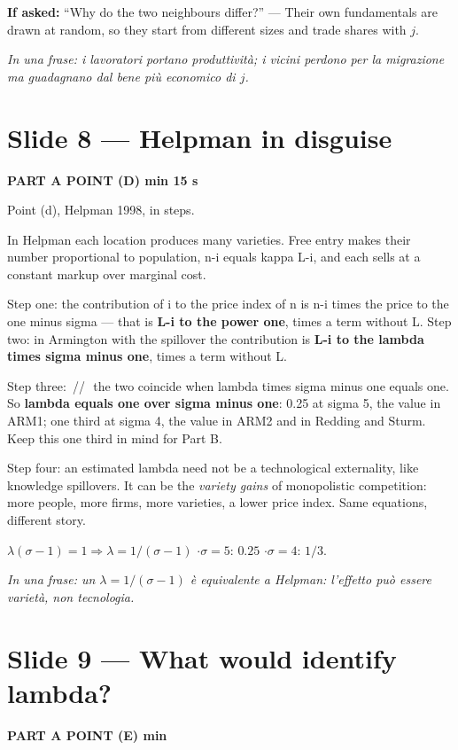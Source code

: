 \documentclass[11pt,a4paper]{article}
\newcommand{\slide}[3]{\Needspace{14\baselineskip}\section{#1}\textcolor{unicared}{\small\bfseries\MakeUppercase{#3}\quad\textperiodcentered\quad #2}\par}
\newcommand{\idea}[1]{\par{\small\itshape\color{unicablue}In una frase: #1}\par}
\newcommand{\pause}{\textcolor{unicared}{\,/\!/\,}}
\begin{document}
\begin{ask}
\textbf{If asked:} ``Why do the two neighbours differ?'' --- Their own fundamentals are drawn at random, so they start from different sizes and trade shares with $j$.
\end{ask}
\idea{i lavoratori portano produttività; i vicini perdono per la migrazione ma guadagnano dal bene più economico di $j$.}

\slide{Slide 8 --- Helpman in disguise}{1 min 15 s}{Part A \textperiodcentered{} point (d)}

\begin{say}
Point (d), Helpman 1998, in steps.

In Helpman each location produces many varieties. Free entry makes their number proportional to population, n-i equals kappa L-i, and each sells at a constant markup over marginal cost.

Step one: the contribution of i to the price index of n is n-i times the price to the one minus sigma --- that is \textbf{L-i to the power one}, times a term without L. Step two: in Armington with the spillover the contribution is \textbf{L-i to the lambda times sigma minus one}, times a term without L.

Step three: \pause\ the two coincide when lambda times sigma minus one equals one. So \textbf{lambda equals one over sigma minus one}: 0.25 at sigma 5, the value in ARM1; one third at sigma 4, the value in ARM2 and in Redding and Sturm. Keep this one third in mind for Part B.

Step four: an estimated lambda need not be a technological externality, like knowledge spillovers. It can be the \emph{variety gains} of monopolistic competition: more people, more firms, more varieties, a lower price index. Same equations, different story.
\end{say}

\begin{nums}
$\lambda(\sigma-1) = 1 \Rightarrow \lambda = 1/(\sigma-1)$ \quad$\cdot$\quad $\sigma=5$: $0.25$ \quad$\cdot$\quad $\sigma = 4$: $1/3$.
\end{nums}
\idea{un $\lambda = 1/(\sigma-1)$ è equivalente a Helpman: l'effetto può essere varietà, non tecnologia.}

\slide{Slide 9 --- What would identify lambda?}{1 min}{Part A \textperiodcentered{} point (e)}
\end{document}
